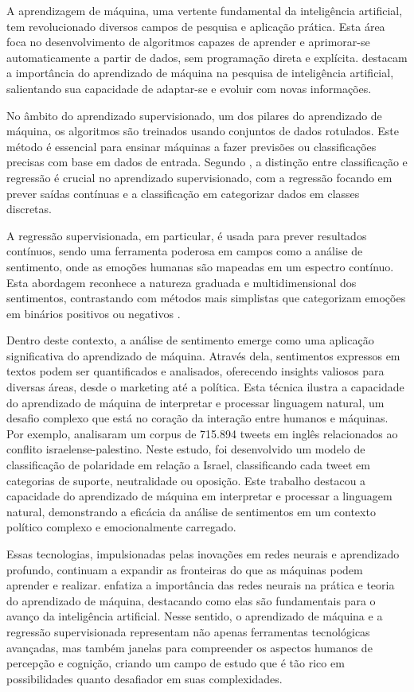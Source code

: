 A aprendizagem de máquina, uma vertente fundamental da inteligência artificial, tem revolucionado diversos campos de pesquisa e aplicação prática. Esta área foca no desenvolvimento de algoritmos capazes de aprender e aprimorar-se automaticamente a partir de dados, sem programação direta e explícita.  destacam a importância do aprendizado de máquina na pesquisa de inteligência artificial, salientando sua capacidade de adaptar-se e evoluir com novas informações.

No âmbito do aprendizado supervisionado, um dos pilares do aprendizado de máquina, os algoritmos são treinados usando conjuntos de dados rotulados. Este método é essencial para ensinar máquinas a fazer previsões ou classificações precisas com base em dados de entrada. Segundo , a distinção entre classificação e regressão é crucial no aprendizado supervisionado, com a regressão focando em prever saídas contínuas e a classificação em categorizar dados em classes discretas.

A regressão supervisionada, em particular, é usada para prever resultados contínuos, sendo uma ferramenta poderosa em campos como a análise de sentimento, onde as emoções humanas são mapeadas em um espectro contínuo. Esta abordagem reconhece a natureza graduada e multidimensional dos sentimentos, contrastando com métodos mais simplistas que categorizam emoções em binários positivos ou negativos \cite{2023_Patrick_IP}.

Dentro deste contexto, a análise de sentimento emerge como uma aplicação significativa do aprendizado de máquina. Através dela, sentimentos expressos em textos podem ser quantificados e analisados, oferecendo insights valiosos para diversas áreas, desde o marketing até a política. Esta técnica ilustra a capacidade do aprendizado de máquina de interpretar e processar linguagem natural, um desafio complexo que está no coração da interação entre humanos e máquinas. Por exemplo,  analisaram um corpus de 715.894 tweets em inglês relacionados ao conflito israelense-palestino. Neste estudo, foi desenvolvido um modelo de classificação de polaridade em relação a Israel, classificando cada tweet em categorias de suporte, neutralidade ou oposição. Este trabalho destacou a capacidade do aprendizado de máquina em interpretar e processar a linguagem natural, demonstrando a eficácia da análise de sentimentos em um contexto político complexo e emocionalmente carregado.

Essas tecnologias, impulsionadas pelas inovações em redes neurais e aprendizado profundo, continuam a expandir as fronteiras do que as máquinas podem aprender e realizar.  enfatiza a importância das redes neurais na prática e teoria do aprendizado de máquina, destacando como elas são fundamentais para o avanço da inteligência artificial. Nesse sentido, o aprendizado de máquina e a regressão supervisionada representam não apenas ferramentas tecnológicas avançadas, mas também janelas para compreender os aspectos humanos de percepção e cognição, criando um campo de estudo que é tão rico em possibilidades quanto desafiador em suas complexidades.

